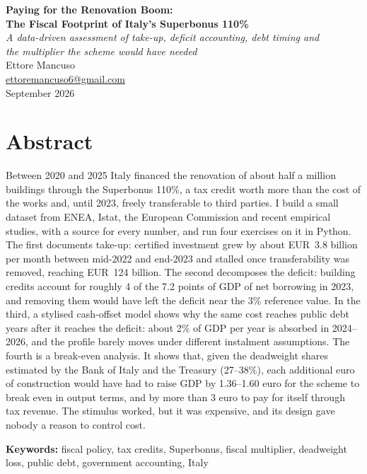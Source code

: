 \documentclass[11pt,a4paper]{article}
\begin{document}
\thispagestyle{empty}
\begin{center}
{\LARGE\bfseries Paying for the Renovation Boom:\\[4pt] The Fiscal Footprint of Italy's Superbonus 110\%}\\[10pt]
{\large\itshape A data-driven assessment of take-up, deficit accounting, debt timing and\\ the multiplier the scheme would have needed}\\[22pt]
{\large Ettore Mancuso}\\[1pt]
\href{mailto:ettoremancuso6@gmail.com}{ettoremancuso6@gmail.com}\\[1pt]
September 2026
\end{center}
\vspace{16pt}

\section*{Abstract}
Between 2020 and 2025 Italy financed the renovation of about half a million buildings through the Superbonus 110\%, a tax credit worth more than the cost of the works and, until 2023, freely transferable to third parties. I build a small dataset from ENEA, Istat, the European Commission and recent empirical studies, with a source for every number, and run four exercises on it in Python. The first documents take-up: certified investment grew by about EUR~3.8 billion per month between mid-2022 and end-2023 and stalled once transferability was removed, reaching EUR~124 billion. The second decomposes the deficit: building credits account for roughly 4 of the 7.2 points of GDP of net borrowing in 2023, and removing them would have left the deficit near the 3\% reference value. In the third, a stylised cash-offset model shows why the same cost reaches public debt years after it reaches the deficit: about 2\% of GDP per year is absorbed in 2024--2026, and the profile barely moves under different instalment assumptions. The fourth is a break-even analysis. It shows that, given the deadweight shares estimated by the Bank of Italy and the Treasury (27--38\%), each additional euro of construction would have had to raise GDP by 1.36--1.60 euro for the scheme to break even in output terms, and by more than 3 euro to pay for itself through tax revenue. The stimulus worked, but it was expensive, and its design gave nobody a reason to control cost.

\medskip
\textbf{Keywords:} fiscal policy, tax credits, Superbonus, fiscal multiplier, deadweight loss, public debt, government accounting, Italy
\end{document}
